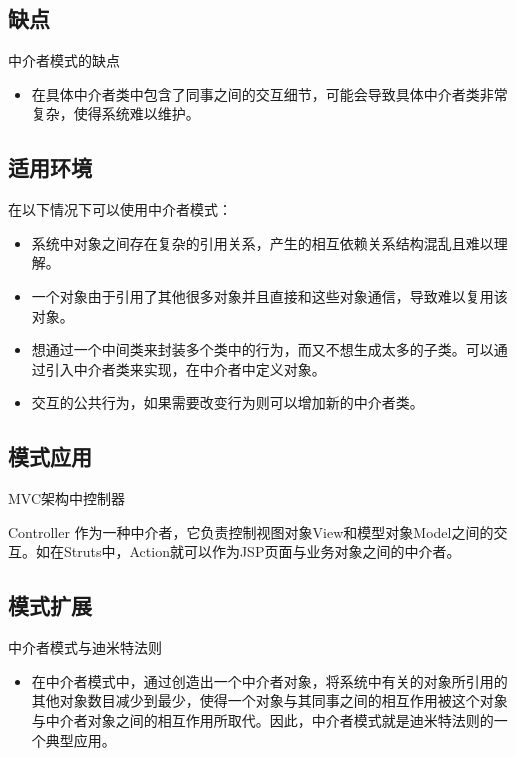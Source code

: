 \documentclass[letterpaper,10pt,english]{sphinxmanual}
\begin{document}
\subsection{缺点}
\label{\detokenize{behavioral_patterns/mediator:id11}}
\sphinxAtStartPar
中介者模式的缺点
\begin{itemize}
\item {} 
\sphinxAtStartPar
在具体中介者类中包含了同事之间的交互细节，可能会导致具体中介者类非常复杂，使得系统难以维护。

\end{itemize}


\subsection{适用环境}
\label{\detokenize{behavioral_patterns/mediator:id12}}
\sphinxAtStartPar
在以下情况下可以使用中介者模式：
\begin{itemize}
\item {} 
\sphinxAtStartPar
系统中对象之间存在复杂的引用关系，产生的相互依赖关系结构混乱且难以理解。

\item {} 
\sphinxAtStartPar
一个对象由于引用了其他很多对象并且直接和这些对象通信，导致难以复用该对象。

\item {} 
\sphinxAtStartPar
想通过一个中间类来封装多个类中的行为，而又不想生成太多的子类。可以通过引入中介者类来实现，在中介者中定义对象。

\item {} 
\sphinxAtStartPar
交互的公共行为，如果需要改变行为则可以增加新的中介者类。

\end{itemize}


\subsection{模式应用}
\label{\detokenize{behavioral_patterns/mediator:id13}}
\sphinxAtStartPar
MVC架构中控制器

\sphinxAtStartPar
Controller 作为一种中介者，它负责控制视图对象View和模型对象Model之间的交互。如在Struts中，Action就可以作为JSP页面与业务对象之间的中介者。


\subsection{模式扩展}
\label{\detokenize{behavioral_patterns/mediator:id14}}
\sphinxAtStartPar
中介者模式与迪米特法则
\begin{itemize}
\item {} 
\sphinxAtStartPar
在中介者模式中，通过创造出一个中介者对象，将系统中有关的对象所引用的其他对象数目减少到最少，使得一个对象与其同事之间的相互作用被这个对象与中介者对象之间的相互作用所取代。因此，中介者模式就是迪米特法则的一个典型应用。

\end{itemize}
\end{document}
